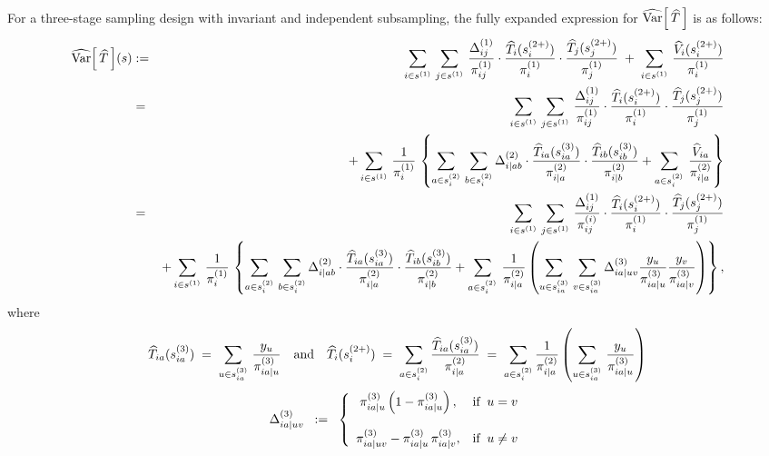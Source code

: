 \begin{corollary}\mbox{}\\
For a three-stage sampling design with invariant and independent subsampling,
the fully expanded expression for $\widehat{\textnormal{Var}}\!\left[\,\widehat{T}\,\right]$ is as follows:
\begin{eqnarray*}
\widehat{\textnormal{Var}}\!\left[\,\widehat{T}\,\right]\!(s)
&:=&
\sum_{i\in s^{(1)}}\,\sum_{j\in s^{(1)}}\,
\dfrac{\Delta^{(1)}_{ij}}{\pi^{(1)}_{ij}}
\cdot
\dfrac{\widehat{T}_{i}(s^{(2+)}_{i})}{\pi^{(1)}_{i}}
\cdot
\dfrac{\widehat{T}_{j}(s^{(2+)}_{j})}{\pi^{(1)}_{j}}
\;+\;
\sum_{i\in s^{(1)}}\,\dfrac{\widehat{V}_{i}(s^{(2+)}_{i})}{\pi^{(1)}_{i}}
\\
&=&
\sum_{i\in s^{(1)}}\,\sum_{j\in s^{(1)}}\,
\dfrac{\Delta^{(1)}_{ij}}{\pi^{(1)}_{ij}}
\cdot
\dfrac{\widehat{T}_{i}(s^{(2+)}_{i})}{\pi^{(1)}_{i}}
\cdot
\dfrac{\widehat{T}_{j}(s^{(2+)}_{j})}{\pi^{(1)}_{j}}
\\&&
+
\sum_{i\in s^{(1)}}\,\dfrac{1}{\pi^{(1)}_{i}}\,\left\{
\sum_{a\in s^{(2)}_{i}}\,\sum_{b\in s^{(2)}_{i}}
\Delta^{(2)}_{i \vert ab}\cdot\dfrac{\widehat{T}_{ia}(s^{(3)}_{ia})}{\pi^{(2)}_{i \vert a}}\cdot\dfrac{\widehat{T}_{ib}(s^{(3)}_{ib})}{\pi^{(2)}_{i \vert b}}
+
\sum_{a \in s^{^{(2)}}_{i}}\,\dfrac{\widehat{V}_{ia}}{\pi^{(2)}_{i \vert a}}
\right\}
\\
&=&
\sum_{i\in s^{(1)}}\,\sum_{j\in s^{(1)}}\,
\dfrac{\Delta^{(1)}_{ij}}{\pi^{(i)}_{ij}}
\cdot
\dfrac{\widehat{T}_{i}(s^{(2+)}_{i})}{\pi^{(1)}_{i}}
\cdot
\dfrac{\widehat{T}_{j}(s^{(2+)}_{j})}{\pi^{(1)}_{j}}
\\&&
+
\sum_{i\in s^{(1)}}\,\dfrac{1}{\pi^{(1)}_{i}}\,\left\{
\sum_{a\in s^{(2)}_{i}}\,\sum_{b\in s^{(2)}_{i}}
\Delta^{(2)}_{i \vert ab}\cdot\dfrac{\widehat{T}_{ia}(s^{(3)}_{ia})}{\pi^{(2)}_{i \vert a}}\cdot\dfrac{\widehat{T}_{ib}(s^{(3)}_{ib})}{\pi^{(2)}_{i \vert b}}
+
\sum_{a \in s^{^{(2)}}_{i}}\,\dfrac{1}{\pi^{(2)}_{i \vert a}}
\left(\sum_{u \in s^{(3)}_{ia}}\,\sum_{v \in s^{(3)}_{ia}}\Delta^{(3)}_{ia\vert uv}\dfrac{y_{u}}{\pi^{(3)}_{ia\vert u}}\dfrac{y_{v}}{\pi^{(3)}_{ia\vert v}}\right)
\right\},
\end{eqnarray*}
where
\begin{equation*}
\widehat{T}_{ia}(s^{(3)}_{ia})\;=\;\sum_{u \in s^{(3)}_{ia}}\,\dfrac{y_{u}}{\pi^{(3)}_{ia\vert u}}
\quad\textnormal{and}\quad
\widehat{T}_{i}(s^{(2+)}_{i})
\;=\;\sum_{a\in s^{(2)}_{i}}\dfrac{\widehat{T}_{ia}(s^{(3)}_{ia})}{\pi^{(2)}_{i\vert a}}
\;=\;\sum_{a\in s^{(2)}_{i}}\dfrac{1}{\pi^{(2)}_{i\vert a}}\left(\sum_{u \in s^{(3)}_{ia}}\,\dfrac{y_{u}}{\pi^{(3)}_{ia\vert u}}\right)
\end{equation*}
\begin{equation*}
\Delta^{(3)}_{ia \vert uv}
\;\;:=\;\;
\left\{
\begin{array}{cl}
\pi^{(3)}_{ia \vert u}\left(1 - \pi^{(3)}_{ia \vert u}\right), & \textnormal{if}\;\; u = v
\\ \\
\pi^{(3)}_{ia \vert uv} - \pi^{(3)}_{ia \vert u}\,\pi^{(3)}_{ia \vert v}, & \textnormal{if}\;\; u \neq v
\end{array}
\right.
\end{equation*}
\end{corollary}
